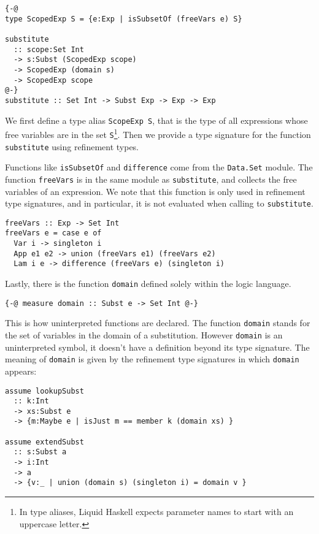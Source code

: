 \documentclass[sigconf, anonymous, review]{acmart}
\newcommand{\tc}[1]{{\small\texttt{#1}}}
\begin{document}
\begin{verbatim}
{-@
type ScopedExp S = {e:Exp | isSubsetOf (freeVars e) S}

substitute
  :: scope:Set Int
  -> s:Subst (ScopedExp scope)
  -> ScopedExp (domain s)
  -> ScopedExp scope
@-}
substitute :: Set Int -> Subst Exp -> Exp -> Exp
\end{verbatim}

We first define a type alias \tc{ScopeExp S}, that is the type of all
expressions whose free variables are in the set \tc{S}\footnote{In type aliases,
Liquid Haskell expects parameter names to start with an uppercase letter.}.
Then we provide a type signature for the function \tc{substitute} using
refinement types.

Functions like \tc{isSubsetOf} and \tc{difference} come from the \tc{Data.\allowbreak Set}
module. The function \tc{freeVars} is in the same module as \tc{subs\-ti\-tute},
and collects the free variables of an expression. We note that this function
is only used in refinement type signatures, and in particular, it is not evaluated
when calling to \tc{substitute}.

\begin{verbatim}
freeVars :: Exp -> Set Int
freeVars e = case e of
  Var i -> singleton i
  App e1 e2 -> union (freeVars e1) (freeVars e2)
  Lam i e -> difference (freeVars e) (singleton i)
\end{verbatim}

Lastly, there is the function \tc{domain} defined solely within the logic
language.

\begin{verbatim}
{-@ measure domain :: Subst e -> Set Int @-}
\end{verbatim}

This is how uninterpreted functions are declared. The function \tc{domain}
stands for the set of variables in the domain of a substitution. However
\tc{domain} is an uninterpreted symbol, it doesn't have a definition beyond its
type signature. The meaning of \tc{domain} is given by the refinement type
signatures in which \tc{domain} appears:

\begin{verbatim}
assume lookupSubst
  :: k:Int
  -> xs:Subst e
  -> {m:Maybe e | isJust m == member k (domain xs) }

assume extendSubst
  :: s:Subst a
  -> i:Int
  -> a
  -> {v:_ | union (domain s) (singleton i) = domain v }
\end{verbatim}
\end{document}
